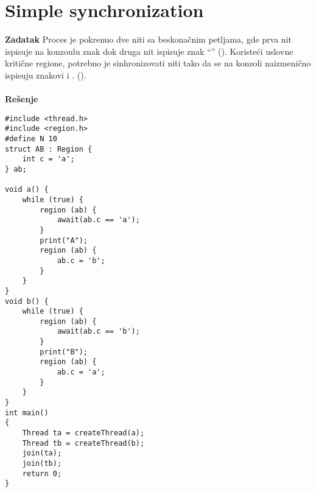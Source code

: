 \clearpage
\section{\latin Simple synchronization}
\textbf{\large Zadatak} Proces je pokrenuo dve niti sa beskona\v{c}nim petljama, gde prva nit ispisuje na konzoulu znak  dok druga nit ispisuje znak ``'' (). Koriste\'{c}i uslovne kriti\v{c}ne regione, potrebno je sinhronizovati niti tako da se na konzoli naizmeni\v{c}no ispisuju znakovi  i . ().
\\\\
\textbf{\large Re\v{s}enje}
\begin{lstlisting}
#include <thread.h>
#include <region.h>
#define N 10
struct AB : Region {
    int c = 'a';
} ab;

void a() {
    while (true) {
        region (ab) {
            await(ab.c == 'a');
        }
        print("A");
        region (ab) {
            ab.c = 'b';
        }
    }
}
void b() {
    while (true) {
        region (ab) {
            await(ab.c == 'b');
        }
        print("B");
        region (ab) {
            ab.c = 'a';
        }
    }
}
int main() 
{
    Thread ta = createThread(a);
    Thread tb = createThread(b);
    join(ta);
    join(tb);
    return 0;
}
\end{lstlisting}